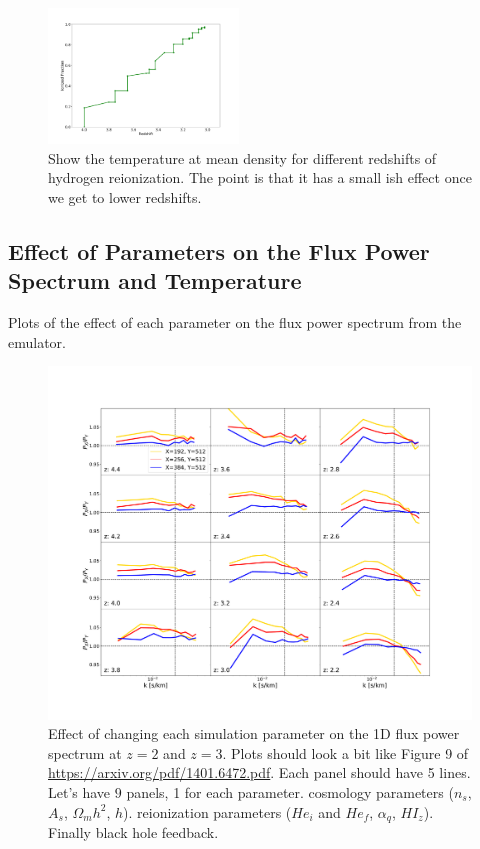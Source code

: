 \documentclass[a4paper,11pt]{article}
\begin{document}
\begin{figure}
\includegraphics[width=0.45\textwidth]{figures/HeIonFrac.pdf}
 \caption{Show the temperature at mean density for different redshifts of hydrogen reionization. The point is that it has a small ish effect once we get to lower redshifts.}
 \label{fig:hydrogentempdens}
\end{figure}

\subsection{Effect of Parameters on the Flux Power Spectrum and Temperature}

Plots of the effect of each parameter on the flux power spectrum from the emulator.

\begin{figure}
    \centering
	\includegraphics[width=\columnwidth]{figures/fps_mfr.pdf}
    \caption{Effect of changing each simulation parameter on the 1D flux power spectrum at $z=2$ and $z=3$. Plots should look a bit like Figure 9 of \url{https://arxiv.org/pdf/1401.6472.pdf}. Each panel should have 5 lines. Let's have $9$ panels, 1 for each parameter. cosmology parameters ($n_s$, $A_s$, $\Omega_m h^2$, $h$). reionization parameters ($He_i$ and $He_f$, $\alpha_q$, $HI_z$). Finally black hole feedback. }
    \label{fig:fluxpower}
\end{figure}
\end{document}
